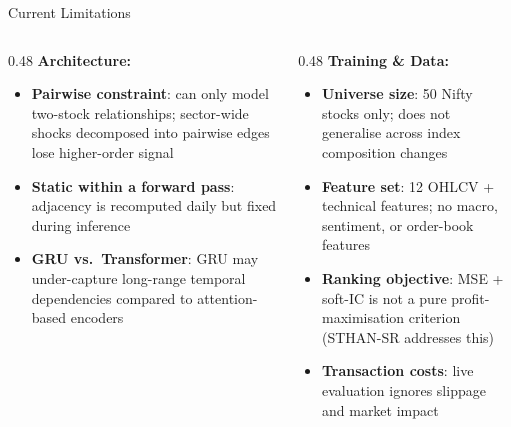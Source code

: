 \documentclass[aspectratio=169, 10pt]{beamer}
\begin{document}
\begin{frame}[shrink=12]{Current Limitations}
  \begin{columns}[T]
    \begin{column}{0.48\textwidth}
      \textbf{Architecture:}
      \begin{itemize}\setlength{\itemsep}{3pt}
        \item \textbf{Pairwise constraint}: can only model two-stock
              relationships; sector-wide shocks decomposed into pairwise
              edges lose higher-order signal
        \item \textbf{Static within a forward pass}: adjacency is
              recomputed daily but fixed during inference
        \item \textbf{GRU vs.\ Transformer}: GRU may under-capture
              long-range temporal dependencies compared to
              attention-based encoders
      \end{itemize}
    \end{column}
    \begin{column}{0.48\textwidth}
      \textbf{Training \& Data:}
      \begin{itemize}\setlength{\itemsep}{3pt}
        \item \textbf{Universe size}: 50 Nifty stocks only; does not
              generalise across index composition changes
        \item \textbf{Feature set}: 12 OHLCV + technical features; no
              macro, sentiment, or order-book features
        \item \textbf{Ranking objective}: MSE + soft-IC is not a pure
              profit-maximisation criterion (STHAN-SR addresses this)
        \item \textbf{Transaction costs}: live evaluation ignores
              slippage and market impact
      \end{itemize}
    \end{column}
  \end{columns}
\end{frame}
\end{document}

